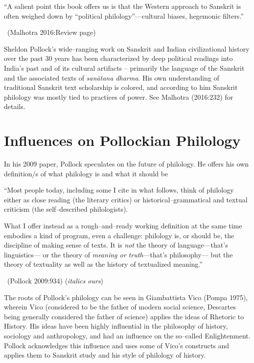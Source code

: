 \begin{myquote}
“A salient point this book offers us is that the Western approach to Sanskrit is often weighed down by “political philology”—cultural biases, hegemonic filters.” 

~\hfill (Malhotra 2016:Review page)
\end{myquote}

Sheldon Pollock’s wide–ranging work on Sanskrit and Indian civilizational history over the past 30 years has been characterized by deep political readings into India’s past and of its cultural artifacts – primarily the language of the Sanskrit and the associated texts of \textit{sanātana dharma}. His own understanding of traditional Sanskrit text scholarship is colored, and according to him Sanskrit philology was mostly tied to practices of power. See Malhotra (2016:232) for details.


\section*{Influences on Pollockian Philology}

In his 2009 paper, Pollock speculates on the future of philology. He offers his own definition/s of what philology is and what it should be

\begin{myquote}
“Most people today, including some I cite in what follows, think of philology either as close reading (the literary critics) or historical–grammatical and textual criticism (the self–described philologists).
\end{myquote}

\begin{myquote}
What I offer instead as a rough–and–ready working definition at the same time embodies a kind of program, even a challenge: philology is, or should be, the discipline of making sense of texts. It is \textit{not} the theory of language—that’s linguistics— or the theory of \textit{meaning or truth}—that’s philosophy— but the theory of textuality as well as the history of textualized meaning.” 

~\hfill (Pollock 2009:934) (\textit{italics ours})
\end{myquote}

The roots of Pollock’s philology can be seen in Giambattista Vico (Pompa 1975), wherein Vico (considered to be the father of modern social science, Descartes being generally considered the father of science) applies the ideas of Rhetoric to History. His ideas have been highly influential in the philosophy of history, sociology and anthropology, and had an influence on the so–called Enlightenment. Pollock acknowledges this influence and uses some of Vico’s constructs and applies them to Sanskrit study and his style of philology of history.

